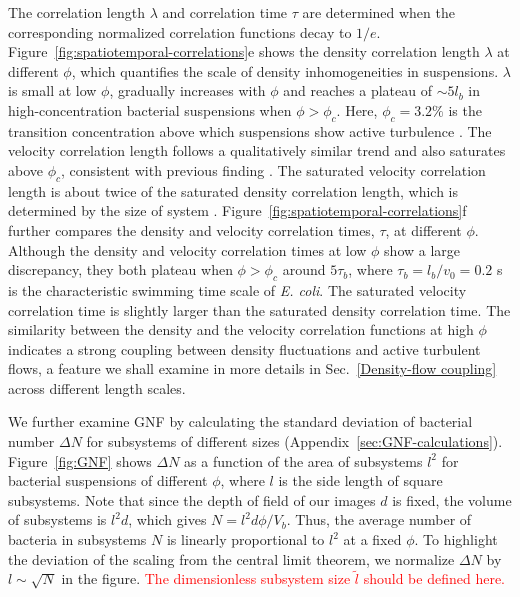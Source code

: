 \documentclass[twocolumn,aps,prx,amsmath,amssymb,longbibliography,superscriptaddress]{revtex4-2}
\begin{document}
The correlation length $\lambda$ and correlation time $\tau$ are determined when the corresponding normalized correlation functions decay to $1/e$. Figure~\ref{fig:spatiotemporal-correlations}e shows the density correlation length $\lambda$ at different $\phi$, which quantifies the scale of density inhomogeneities in suspensions.
$\lambda$ is small at low $\phi$, gradually increases with $\phi$ and reaches a plateau of $\sim 5l_b$ in high-concentration bacterial suspensions when $\phi > \phi_c$. Here, $\phi_c = 3.2\%$ is the transition concentration above which suspensions show active turbulence \cite{Peng2020}.
The velocity correlation length follows a qualitatively similar trend and also saturates above $\phi_c$, consistent with previous finding \cite{Sokolov2007}. The saturated velocity correlation length is about twice of the saturated density correlation length, which is determined by the size of system \cite{Guo2018}.  Figure~\ref{fig:spatiotemporal-correlations}f further compares the density and velocity correlation times, $\tau$, at different $\phi$. Although the density and velocity correlation times at low $\phi$ show a large discrepancy, they both plateau when $\phi > \phi_c$ around $5\tau_b$, where $\tau_b=l_b/v_0=0.2$ s is the characteristic swimming time scale of \textit{E. coli}. The saturated velocity correlation time is slightly larger than the saturated density correlation time. The similarity between the density and the velocity correlation functions at high $\phi$ indicates a strong coupling between density fluctuations and active turbulent flows, a feature we shall
examine in more details in Sec.~\ref{Density-flow coupling} across different length scales.


We further examine GNF by calculating the standard deviation of bacterial number $\Delta N$ for subsystems of different sizes (Appendix~\ref{sec:GNF-calculations}). Figure~\ref{fig:GNF} shows $\Delta N$ as a function of the area of subsystems $l^2$ for bacterial suspensions of different $\phi$, where $l$ is the side length of square subsystems. Note that since the depth of field of our images $d$ is fixed, the volume of subsystems is $l^2 d$, which gives $N = l^2d \phi/V_b$. Thus, the average number of bacteria in subsystems $N$ is linearly proportional to $l^2$ at a fixed $\phi$. To highlight the deviation of the scaling from the central limit theorem, we normalize $\Delta N$ by $l \sim \sqrt N$ in the figure. \textcolor{red}{The dimensionless subsystem size $\tilde{l}$ should be defined here.}
\end{document}
